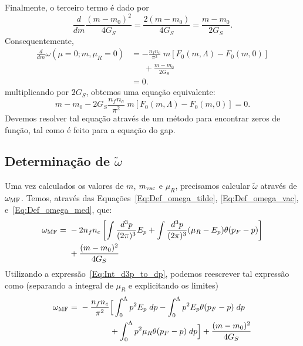 Finalmente, o terceiro termo é dado por
\begin{equation}
	\frac{d}{dm} \frac{(m - m_0)^2}{4G_S} = \frac{2 (m - m_0)}{4G_S} = \frac{m - m_0}{2G_S}.
\end{equation}
%
Consequentemente,
\begin{align}
	\frac{d}{dm} \omega(\mu = 0; m, \mu_R = 0) &= - \frac{n_f n_c}{\pi^2} \;m [F_0(m, \Lambda) - F_0(m,0)] \\
	&\phantom{=}~+ \frac{m - m_0}{2G_S} \nonumber \\
	&= 0.
\end{align}
%
multiplicando por $2G_S$, obtemos uma equação equivalente:
\begin{equation}\label{Eq:Calculo_m_vac}
	m - m_0 - 2G_S\frac{n_f n_c}{\pi^2} \;m [F_0(m, \Lambda) - F_0(m,0)] = 0.
\end{equation}
%
Devemos resolver tal equação através de um método para encontrar zeros de função, tal como é feito para a equação do gap.

\subsection{Determinação de $\tilde{\omega}$}

Uma vez calculados os valores de $m$, $m_{\rm{vac}}$ e $\mu_R$, precisamos calcular $\tilde\omega$ através de $\omega_{\rm{MF}}$. Temos, através das Equações~\eqref{Eq:Def_omega_tilde}, \eqref{Eq:Def_omega_vac}, e~\eqref{Eq:Def_omega_med}, que:
\begin{equation}
\begin{split}
\omega_{\rm{MF}} =&~ -2 n_f n_c \left[\int\frac{d^3p}{(2\pi)^3} E_p + \int\frac{d^3p}{(2\pi)^3}(\mu_R - E_p)\theta(p_F - p)\right] \\
&~+ \frac{(m-m_0)^2}{4G_S}
\end{split}
\end{equation}
%
Utilizando a expressão~\eqref{Eq:Int_d3p_to_dp}, podemos reescrever tal expressão como (separando a integral de $\mu_R$ e explicitando os limites)
\begin{equation}
\begin{split}
\omega_{\rm{MF}} =&~ - \frac{n_f n_c}{\pi^2} \Big[\int_0^\Lambda p^2E_p \; dp - \int_0^\Lambda p^2 E_p \theta(p_F - p)\;dp \\
&~\phantom{- \frac{n_f n_c}{\pi^2} \Big[} + \int_0^\Lambda p^2 \mu_R \theta(p_F - p)\;dp \Big] + \frac{(m-m_0)^2}{4G_S}
\end{split}
\end{equation}

